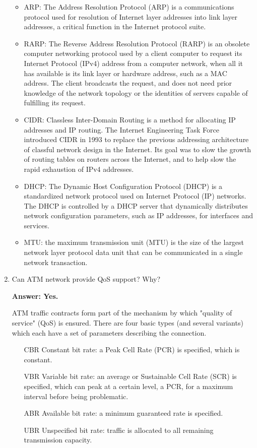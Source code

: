 \begin{enumerate}
\begin{itemize}
	    \item ARP: The Address Resolution Protocol (ARP) is a communications protocol used for resolution of Internet layer addresses into link layer addresses, a critical function in the Internet protocol suite.
	    
	    \item RARP: The Reverse Address Resolution Protocol (RARP) is an obsolete computer networking protocol used by a client computer to request its Internet Protocol (IPv4) address from a computer network, when all it has available is its link layer or hardware address, such as a MAC address. The client broadcasts the request, and does not need prior knowledge of the network topology or the identities of servers capable of fulfilling its request.
	    
	    \item CIDR: Classless Inter-Domain Routing is a method for allocating IP addresses and IP routing. The Internet Engineering Task Force introduced CIDR in 1993 to replace the previous addressing architecture of classful network design in the Internet. Its goal was to slow the growth of routing tables on routers across the Internet, and to help slow the rapid exhaustion of IPv4 addresses.
	    
	    \item DHCP: The Dynamic Host Configuration Protocol (DHCP) is a standardized network protocol used on Internet Protocol (IP) networks. The DHCP is controlled by a DHCP server that dynamically distributes network configuration parameters, such as IP addresses, for interfaces and services.
	    
	    \item MTU: the maximum transmission unit (MTU) is the size of the largest network layer protocol data unit that can be communicated in a single network transaction.
	\end{itemize}

	\item Can ATM network provide QoS support? Why?
	
	\textbf{Answer: Yes.}
	
	ATM traffic contracts form part of the mechanism by which "quality of service" (QoS) is ensured. There are four basic types (and several variants) which each have a set of parameters describing the connection.

    \begin{enumerate}
        \item[CBR] Constant bit rate: a Peak Cell Rate (PCR) is specified, which is constant.
        \item[VBR] Variable bit rate: an average or Sustainable Cell Rate (SCR) is specified, which can peak at a certain level, a PCR, for a maximum interval before being problematic.
        \item[ABR] Available bit rate: a minimum guaranteed rate is specified.
        \item[UBR] Unspecified bit rate: traffic is allocated to all remaining transmission capacity.
    \end{enumerate}
    

\end{enumerate}
